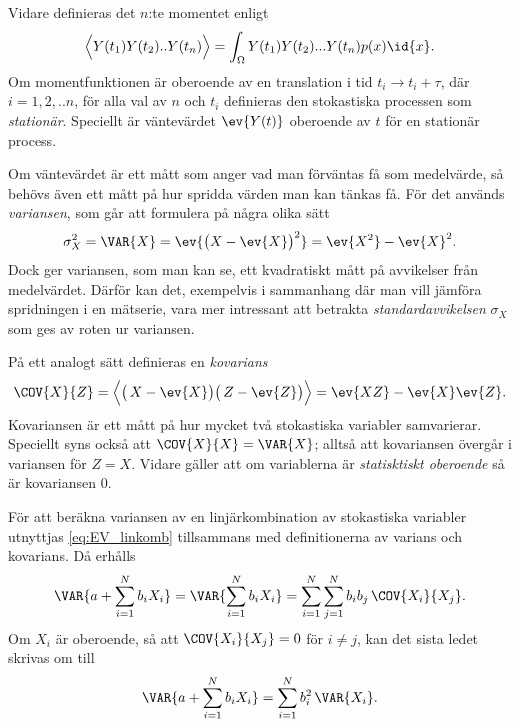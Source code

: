 Vidare definieras det $n$:te momentet enligt 
\begin{equation}
\Big\langle Y(t_1)Y(t_2)..Y(t_n) \Big\rangle 
= \int_{\Omega} Y(t_1)Y(t_2)...Y(t_n)p(x)\id{x}.
\end{equation}
Om momentfunktionen är oberoende av en translation i tid $t_i\to t_i+\tau$, där $i=1,2,..n$, för alla val av $n$ och $t_i$ definieras den stokastiska processen som \emph{stationär}. Speciellt är väntevärdet $\ev{Y(t)}$ oberoende av $t$ för en stationär process. 

Om väntevärdet är ett mått som anger vad man förväntas få som medelvärde, så behövs även ett mått på hur spridda värden man kan tänkas få. För det används \emph{variansen}, som går att formulera på några olika sätt~\cite{Rice_matstat2006}
\begin{equation}\label{eq:VAR}
\sigma_X^2=\VAR{X} = \ev{\big(X-\ev{X} \big)^2} = \ev{X^2}-\ev{X}^2.
\end{equation}
Dock ger variansen, som man kan se, ett kvadratiskt mått på avvikelser från medelvärdet. Därför kan det, exempelvis i sammanhang där man vill jämföra spridningen i en mätserie, vara mer intressant att betrakta \emph{standardavvikelsen} $\sigma_X$ som ges av roten ur variansen.


På ett analogt sätt definieras en \emph{kovarians}~\cite{Rice_matstat2006}
\begin{equation}\label{eq:COV}
\COV{X}{Z} 
= \Big\langle \big(\, X-\ev{X}\big) \big(\, Z-\ev{Z}\big) \Big\rangle
= \ev{XZ}-\ev{X}\ev{Z}.
\end{equation}
Kovariansen är ett mått på hur mycket två stokastiska variabler samvarierar. Speciellt syns också att $\COV{X}{X}=\VAR{X}$; alltså att kovariansen övergår i variansen för $Z=X$. Vidare gäller att om variablerna är \emph{statisktiskt oberoende} så är kovariansen 0.

För att beräkna variansen av en linjärkombination av stokastiska variabler utnyttjas \eqref{eq:EV_linkomb} tillsammans med definitionerna av varians och kovarians. Då erhålls
\begin{equation}
\VAR{a+\sum_{i=1}^N b_i X_i} = \VAR{\sum_{i=1}^N b_i X_i} 
= \sum_{i=1}^N\sum_{j=1}^N b_i b_j\, \COV{X_i}{X_j}.
\end{equation}
Om $X_i$ är oberoende, så att $\COV{X_i}{X_j}=0$ för $i\neq j$, kan det sista ledet skrivas om till
\begin{equation}\label{eq:VAR_linkomb}
\VAR{a+\sum_{i=1}^N b_i X_i} = \sum_{i=1}^N b_i^2\, \VAR{X_i}.
\end{equation}




